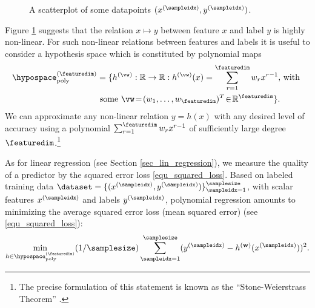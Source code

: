 \documentclass[12pt]{report}
\begin{document}
\begin{figure}[htbp]
\begin{center}
\end{center}
\caption{A scatterplot of some datapoints $(x^{(\sampleidx)},y^{(\sampleidx)})$.} 
\label{fig_scatterplot_poly}
\end{figure}

Figure \ref{fig_scatterplot_poly} suggests that the relation $x \mapsto y$ between feature 
$x$ and label $y$ is highly non-linear. For such non-linear relations between features and 
labels it is useful to consider a hypothesis space which is constituted by polynomial maps
\begin{align}
\label{equ_def_poly_hyposapce}
\hypospace^{(\featuredim)}_{\rm poly}& = \{ h^{(\vw)}: \mathbb{R} \rightarrow \mathbb{R}: h^{(\vw)}(x) = \sum_{r=1}^{\featuredim} w_{r} x^{r-1} \mbox{, with } \nonumber \\ 
& \mbox{ some } \vw\!=\!(w_{1},\ldots,w_{\featuredim})^{T}\!\in\!\mathbb{R}^{\featuredim} \}. 
\end{align}
We can approximate any non-linear relation $y\!=\!h(x)$ with any desired level of 
accuracy using a polynomial $\sum_{r=1}^{\featuredim} w_{r} x^{r-1}$ of sufficiently large 
degree $\featuredim$.\footnote{The precise formulation of this statement is known as the 
``Stone-Weierstrass Theorem'' \cite[Thm. 7.26]{RudinBookPrinciplesMatheAnalysis}.}

As for linear regression (see Section \ref{sec_lin_regression}), we measure the quality 
of a predictor by the squared error loss \eqref{equ_squared_loss}. Based on labeled 
training data $\dataset =\{ (x^{(\sampleidx)},y^{(\sampleidx)}) \}_{\sampleidx=1}^{\samplesize}$, 
with scalar features $x^{(\sampleidx)}$ and labels $y^{(\sampleidx)}$, polynomial regression amounts to 
minimizing the average squared error loss (mean squared error) (see \eqref{equ_squared_loss}):
\begin{equation} 
\label{opt_hypo_poly}
\min_{h \in \hypospace_{\rm poly}^{(\featuredim)} } (1/\samplesize) \sum_{\sampleidx=1}^{\samplesize} (y^{(\sampleidx)} - h^{(\mathbf{w})}(x^{(\sampleidx)}))^{2}.
\end{equation} 
\end{document}
